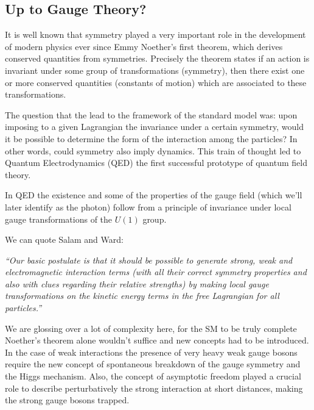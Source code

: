 \subsection{Up to Gauge Theory?}

It is well known that symmetry played a very important role in the development of modern physics ever since Emmy Noether's first theorem, which derives conserved quantities from symmetries. Precisely the theorem states if an action is invariant under some group of transformations (symmetry), then there exist one or more conserved quantities (constants of motion) which are associated to these transformations. 

The question that the lead to the framework of the standard model was:  upon imposing to a given Lagrangian the invariance under a certain symmetry, would it be possible to determine the form of the interaction among the particles? In other words, could symmetry also imply dynamics. This train of thought led to Quantum Electrodynamics (QED) the first successful prototype of quantum field theory.

In QED the existence and some of the properties of the gauge field (which we'll later identify as the photon) follow from a principle of invariance under local gauge transformations of the $U(1)$ group.

We can quote Salam and Ward: %

\textit{“Our basic postulate is that it should be possible to generate strong,  weak and electromagnetic  interaction terms (with all their correct symmetry properties and also with clues regarding their relative strengths) by making local gauge transformations on the kinetic energy terms in the free Lagrangian for all particles.”}

We are glossing over a lot of complexity here, for the SM to be truly  complete Noether's theorem alone wouldn't suffice and new concepts had to be introduced. In the case of weak interactions the presence of very heavy weak gauge bosons require the new concept of spontaneous breakdown  of  the  gauge  symmetry and  the Higgs  mechanism. 
%
Also, the  concept  of  asymptotic  freedom 
% 
played a crucial role to describe perturbatively the strong interaction at short distances, making the strong gauge bosons trapped. 

